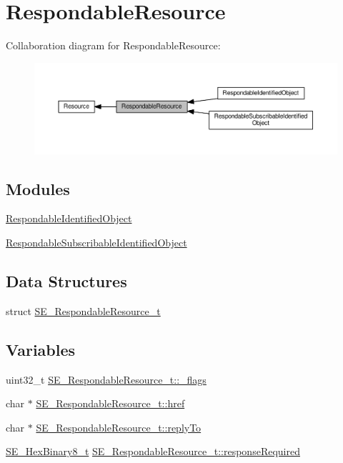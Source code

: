 \hypertarget{group__RespondableResource}{}\section{Respondable\+Resource}
\label{group__RespondableResource}
Collaboration diagram for Respondable\+Resource\+:\nopagebreak
\begin{figure}[H]
\begin{center}
\leavevmode
\includegraphics[width=350pt]{group__RespondableResource}
\end{center}
\end{figure}
\subsection*{Modules}
\begin{DoxyCompactItemize}
\item 
\hyperlink{group__RespondableIdentifiedObject}{Respondable\+Identified\+Object}
\item 
\hyperlink{group__RespondableSubscribableIdentifiedObject}{Respondable\+Subscribable\+Identified\+Object}
\end{DoxyCompactItemize}
\subsection*{Data Structures}
\begin{DoxyCompactItemize}
\item 
struct \hyperlink{structSE__RespondableResource__t}{S\+E\+\_\+\+Respondable\+Resource\+\_\+t}
\end{DoxyCompactItemize}
\subsection*{Variables}
\begin{DoxyCompactItemize}
\item 
uint32\+\_\+t \hyperlink{group__RespondableResource_gafd63cff3cd9c63ab4d2a82f616d05873}{S\+E\+\_\+\+Respondable\+Resource\+\_\+t\+::\+\_\+flags}
\item 
char $\ast$ \hyperlink{group__RespondableResource_gaad79f8e15991323308a92c3ddb5bcbfb}{S\+E\+\_\+\+Respondable\+Resource\+\_\+t\+::href}
\item 
char $\ast$ \hyperlink{group__RespondableResource_ga68cb66f1c816c9977f400ea0d41ee9f4}{S\+E\+\_\+\+Respondable\+Resource\+\_\+t\+::reply\+To}
\item 
\hyperlink{group__HexBinary8_gaecf2dab3615fb954a693c017a61f77d6}{S\+E\+\_\+\+Hex\+Binary8\+\_\+t} \hyperlink{group__RespondableResource_ga12d77f129ff2b72e1fd8c1de2ec7cb6c}{S\+E\+\_\+\+Respondable\+Resource\+\_\+t\+::response\+Required}
\end{DoxyCompactItemize}


